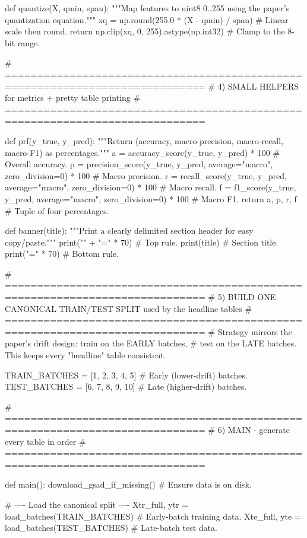 def quantize(X, qmin, span):
    """Map features to uint8 0..255 using the paper's quantization equation."""
    xq = np.round(255.0 * (X - qmin) / span)        # Linear scale then round.
    return np.clip(xq, 0, 255).astype(np.int32)     # Clamp to the 8-bit range.

# =============================================================================
# 4) SMALL HELPERS for metrics + pretty table printing
# =============================================================================

def prf(y_true, y_pred):
    """Return (accuracy, macro-precision, macro-recall, macro-F1) as percentages."""
    a = accuracy_score(y_true, y_pred) * 100        # Overall accuracy.
    p = precision_score(y_true, y_pred, average="macro", zero_division=0) * 100  # Macro precision.
    r = recall_score(y_true, y_pred, average="macro", zero_division=0) * 100     # Macro recall.
    f = f1_score(y_true, y_pred, average="macro", zero_division=0) * 100         # Macro F1.
    return a, p, r, f                               # Tuple of four percentages.

def banner(title):
    """Print a clearly delimited section header for easy copy/paste."""
    print("\n" + "=" * 70)                          # Top rule.
    print(title)                                    # Section title.
    print("=" * 70)                                 # Bottom rule.

# =============================================================================
# 5) BUILD ONE CANONICAL TRAIN/TEST SPLIT used by the headline tables
# =============================================================================
# Strategy mirrors the paper's drift design: train on the EARLY batches,
# test on the LATE batches. This keeps every "headline" table consistent.

TRAIN_BATCHES = [1, 2, 3, 4, 5]                     # Early (lower-drift) batches.
TEST_BATCHES  = [6, 7, 8, 9, 10]                    # Late (higher-drift) batches.

# =============================================================================
# 6) MAIN - generate every table in order
# =============================================================================

def main():
    download_gsad_if_missing()                      # Ensure data is on disk.

    # ---- Load the canonical split ----
    Xtr_full, ytr = load_batches(TRAIN_BATCHES)     # Early-batch training data.
    Xte_full, yte = load_batches(TEST_BATCHES)      # Late-batch test data.

